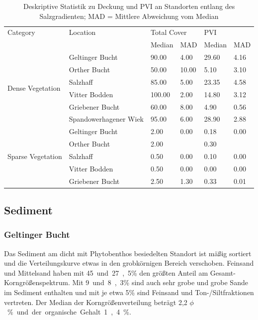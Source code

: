\begin{table}[!htb]{\textwidth}
\centering
\caption[Deskriptive Statistik, Deckung und PVI entlang des Salzgradienten]{Deskriptive Statistik zu Deckung und PVI an Standorten entlang des Salzgradienten; MAD = Mittlere Abweichung vom Median}
\begin{tabular}{llllll}
\toprule
Category & Location 							& \multicolumn{2}{l}{Total Cover} & \multicolumn{2}{l}{PVI}\\
		 &											& Median	& MAD			  & Median	& MAD\\
\midrule
\multirow{6}{*}{Dense Vegetation}& Geltinger Bucht	& 90.00		& 4.00			  & 29.60	& 4.16\\
								 & Orther Bucht		& 50.00		& 10.00			  & 5.10	& 3.10\\
								 & Salzhaff			& 85.00		& 5.00			  & 23.35	& 4.58\\
								 & Vitter Bodden	& 100.00	& 2.00			  & 14.80	& 3.12\\
								 & Griebener Bucht	& 60.00		& 8.00			  & 4.90	& 0.56\\
								 & Spandowerhagener Wiek & 95.00 & 6.00			  & 28.90	& 2.88\\
\midrule
\multirow{5}{*}{Sparse Vegetation}&Geltinger Bucht	& 2.00		& 0.00			  & 0.18	& 0.00\\
								 & Orther Bucht		& 2.00		& 				  & 0.30\\
								 & Salzhaff			& 0.50		& 0.00			  & 0.10	& 0.00\\
								 & Vitter Bodden	& 0.50		& 0.00			  & 0.00	& 0.00\\
								 & Griebener Bucht	& 2.50		& 1.30			  & 0.33	& 0.01\\
\bottomrule
\end{tabular}
\label{tab:statistik_salzgradient_Deckung,PVI}
\end{table}



\subsection{Sediment}

\subsubsection{Geltinger Bucht}

Das Sediment am dicht mit Phytobenthos besiedelten Standort ist mäßig sortiert und die Verteilungskurve etwas in den grobkörnigen Bereich verschoben. Feinsand und Mittelsand haben mit \unit{45 und 27,5}{\%} den größten Anteil am Gesamt-Korngrößenspektrum. Mit \unit{9 und 8,3}{\%} sind auch sehr grobe und grobe Sande im Sediment enthalten und mit je etwa \unit{5}{\%} sind Feinsand und Ton-/Siltfraktionen vertreten. Der Median der Korngrößenverteilung beträgt \unit{2,2 $ \phi $}{\%} und der organische Gehalt \unit{1,4}{\%}.

